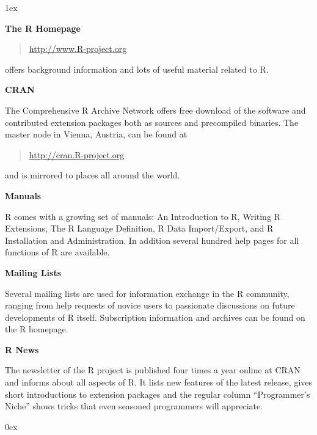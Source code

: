\documentclass[landscape]{article}
\newlength{\colw}
\newcommand{\column}[1]{\hspace*{9mm}{}
  \parbox[t][0.99\textheight][t]{\colw}{\parskip1ex
    #1\parskip0ex}\hspace{9mm}{}}
\begin{document}
\column{
  \textbf{The R Homepage}
  \begin{quote}
    \url{http://www.R-project.org}
  \end{quote}
  offers background information and lots of useful material related to
  R.

  \textbf{CRAN}

  The Comprehensive R Archive Network offers free download of the
  software and contributed extension packages both as sources and
  precompiled binaries. The master node in Vienna, Austria, can be found at
  \begin{quote}
    \url{http://cran.R-project.org}
  \end{quote}
  and is mirrored to places all around the world.

  \textbf{Manuals}

  R comes with a growing set of manuals: An Introduction to R, Writing R
  Extensions, The R Language Definition, R Data Import/Export, and R
  Installation and Administration. In addition several hundred help
  pages for all functions of R are available.

  \textbf{Mailing Lists}

  Several mailing lists are used for information exchange in the R
  community, ranging from help requests of novice users to passionate
  discussions on future developments of R itself. Subscription
  information and archives can be found on the R homepage.

  \textbf{R News}

  The newsletter of the R project is published four times a year
  online at CRAN and informs about all aspects of R. It lists new
  features of the latest release, gives short introductions to
  extension packages and the regular column ``Programmer's Niche''
  shows tricks that even seasoned programmers will appreciate.

  }
\end{document}
